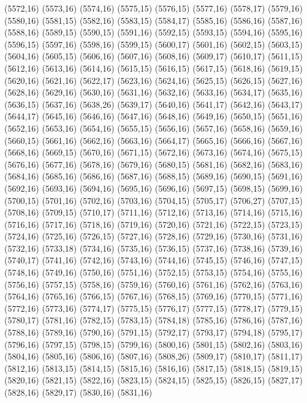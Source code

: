 (5572,16)
(5573,16)
(5574,16)
(5575,15)
(5576,15)
(5577,16)
(5578,17)
(5579,16)
(5580,16)
(5581,15)
(5582,16)
(5583,15)
(5584,17)
(5585,16)
(5586,16)
(5587,16)
(5588,16)
(5589,15)
(5590,15)
(5591,16)
(5592,15)
(5593,15)
(5594,16)
(5595,16)
(5596,15)
(5597,16)
(5598,16)
(5599,15)
(5600,17)
(5601,16)
(5602,15)
(5603,15)
(5604,16)
(5605,15)
(5606,16)
(5607,16)
(5608,16)
(5609,17)
(5610,17)
(5611,15)
(5612,16)
(5613,16)
(5614,16)
(5615,15)
(5616,15)
(5617,15)
(5618,16)
(5619,15)
(5620,16)
(5621,16)
(5622,17)
(5623,16)
(5624,16)
(5625,15)
(5626,15)
(5627,16)
(5628,16)
(5629,16)
(5630,16)
(5631,16)
(5632,16)
(5633,16)
(5634,17)
(5635,16)
(5636,15)
(5637,16)
(5638,26)
(5639,17)
(5640,16)
(5641,17)
(5642,16)
(5643,17)
(5644,17)
(5645,16)
(5646,16)
(5647,16)
(5648,16)
(5649,16)
(5650,15)
(5651,16)
(5652,16)
(5653,16)
(5654,16)
(5655,15)
(5656,16)
(5657,16)
(5658,16)
(5659,16)
(5660,15)
(5661,16)
(5662,16)
(5663,16)
(5664,17)
(5665,16)
(5666,16)
(5667,16)
(5668,16)
(5669,15)
(5670,16)
(5671,15)
(5672,16)
(5673,16)
(5674,16)
(5675,15)
(5676,16)
(5677,16)
(5678,16)
(5679,16)
(5680,15)
(5681,16)
(5682,16)
(5683,16)
(5684,16)
(5685,16)
(5686,16)
(5687,16)
(5688,15)
(5689,16)
(5690,15)
(5691,16)
(5692,16)
(5693,16)
(5694,16)
(5695,16)
(5696,16)
(5697,15)
(5698,15)
(5699,16)
(5700,15)
(5701,16)
(5702,16)
(5703,16)
(5704,15)
(5705,17)
(5706,27)
(5707,15)
(5708,16)
(5709,15)
(5710,17)
(5711,16)
(5712,16)
(5713,16)
(5714,16)
(5715,16)
(5716,16)
(5717,16)
(5718,16)
(5719,16)
(5720,16)
(5721,16)
(5722,15)
(5723,15)
(5724,16)
(5725,16)
(5726,15)
(5727,16)
(5728,16)
(5729,16)
(5730,16)
(5731,16)
(5732,16)
(5733,18)
(5734,16)
(5735,16)
(5736,15)
(5737,16)
(5738,16)
(5739,16)
(5740,17)
(5741,16)
(5742,16)
(5743,16)
(5744,16)
(5745,15)
(5746,16)
(5747,15)
(5748,16)
(5749,16)
(5750,16)
(5751,16)
(5752,15)
(5753,15)
(5754,16)
(5755,16)
(5756,16)
(5757,15)
(5758,16)
(5759,16)
(5760,16)
(5761,16)
(5762,16)
(5763,16)
(5764,16)
(5765,16)
(5766,15)
(5767,16)
(5768,15)
(5769,16)
(5770,15)
(5771,16)
(5772,16)
(5773,16)
(5774,17)
(5775,15)
(5776,17)
(5777,15)
(5778,17)
(5779,15)
(5780,17)
(5781,16)
(5782,15)
(5783,15)
(5784,18)
(5785,16)
(5786,16)
(5787,16)
(5788,16)
(5789,16)
(5790,16)
(5791,15)
(5792,17)
(5793,17)
(5794,18)
(5795,17)
(5796,16)
(5797,15)
(5798,15)
(5799,16)
(5800,16)
(5801,15)
(5802,16)
(5803,16)
(5804,16)
(5805,16)
(5806,16)
(5807,16)
(5808,26)
(5809,17)
(5810,17)
(5811,17)
(5812,16)
(5813,15)
(5814,15)
(5815,16)
(5816,16)
(5817,15)
(5818,15)
(5819,15)
(5820,16)
(5821,15)
(5822,16)
(5823,15)
(5824,15)
(5825,15)
(5826,15)
(5827,17)
(5828,16)
(5829,17)
(5830,16)
(5831,16)

